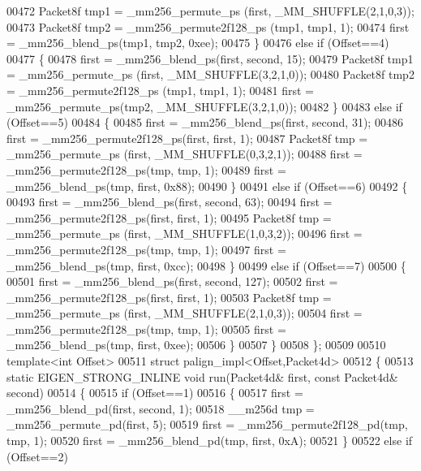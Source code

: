 \begin{DoxyCode}
{{00472       Packet8f tmp1 = \_mm256\_permute\_ps (first, \_MM\_SHUFFLE(2,1,0,3));
00473       Packet8f tmp2 = \_mm256\_permute2f128\_ps (tmp1, tmp1, 1);
00474       first = \_mm256\_blend\_ps(tmp1, tmp2, 0xee);
00475     \}
00476     \textcolor{keywordflow}{else} \textcolor{keywordflow}{if} (Offset==4)
00477     \{
00478       first = \_mm256\_blend\_ps(first, second, 15);
00479       Packet8f tmp1 = \_mm256\_permute\_ps (first, \_MM\_SHUFFLE(3,2,1,0));
00480       Packet8f tmp2 = \_mm256\_permute2f128\_ps (tmp1, tmp1, 1);
00481       first = \_mm256\_permute\_ps(tmp2, \_MM\_SHUFFLE(3,2,1,0));
00482     \}
00483     \textcolor{keywordflow}{else} \textcolor{keywordflow}{if} (Offset==5)
00484     \{
00485       first = \_mm256\_blend\_ps(first, second, 31);
00486       first = \_mm256\_permute2f128\_ps(first, first, 1);
00487       Packet8f tmp = \_mm256\_permute\_ps (first, \_MM\_SHUFFLE(0,3,2,1));
00488       first = \_mm256\_permute2f128\_ps(tmp, tmp, 1);
00489       first = \_mm256\_blend\_ps(tmp, first, 0x88);
00490     \}
00491     \textcolor{keywordflow}{else} \textcolor{keywordflow}{if} (Offset==6)
00492     \{
00493       first = \_mm256\_blend\_ps(first, second, 63);
00494       first = \_mm256\_permute2f128\_ps(first, first, 1);
00495       Packet8f tmp = \_mm256\_permute\_ps (first, \_MM\_SHUFFLE(1,0,3,2));
00496       first = \_mm256\_permute2f128\_ps(tmp, tmp, 1);
00497       first = \_mm256\_blend\_ps(tmp, first, 0xcc);
00498     \}
00499     \textcolor{keywordflow}{else} \textcolor{keywordflow}{if} (Offset==7)
00500     \{
00501       first = \_mm256\_blend\_ps(first, second, 127);
00502       first = \_mm256\_permute2f128\_ps(first, first, 1);
00503       Packet8f tmp = \_mm256\_permute\_ps (first, \_MM\_SHUFFLE(2,1,0,3));
00504       first = \_mm256\_permute2f128\_ps(tmp, tmp, 1);
00505       first = \_mm256\_blend\_ps(tmp, first, 0xee);
00506     \}
00507   \}
00508 \};
00509 
00510 \textcolor{keyword}{template}<\textcolor{keywordtype}{int} Offset>
00511 \textcolor{keyword}{struct }palign\_impl<Offset,Packet4d>
00512 \{
00513   \textcolor{keyword}{static} EIGEN\_STRONG\_INLINE \textcolor{keywordtype}{void} run(Packet4d& first, \textcolor{keyword}{const} Packet4d& second)
00514   \{
00515     \textcolor{keywordflow}{if} (Offset==1)
00516     \{
00517       first = \_mm256\_blend\_pd(first, second, 1);
00518       \_\_m256d tmp = \_mm256\_permute\_pd(first, 5);
00519       first = \_mm256\_permute2f128\_pd(tmp, tmp, 1);
00520       first = \_mm256\_blend\_pd(tmp, first, 0xA);
00521     \}
00522     \textcolor{keywordflow}{else} \textcolor{keywordflow}{if} (Offset==2)
}}
\end{DoxyCode}

